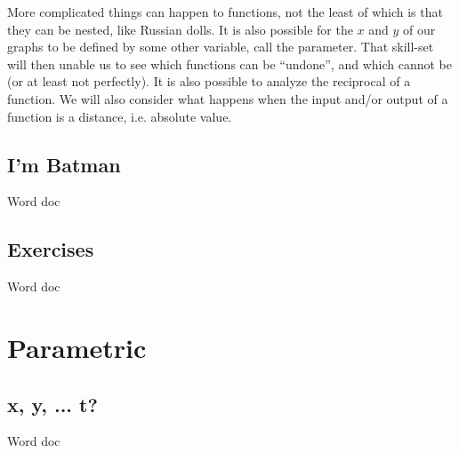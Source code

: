 

More complicated things can happen to functions, not the least of which is that they can be nested, 
like Russian dolls.  It is also possible for the $x$ and $y$ of our graphs to be defined by some
other variable, call the parameter.  That skill-set will then unable us to see which functions can
be ``undone'', and which cannot be (or at least not perfectly).  It is also possible 
to analyze the reciprocal of a function.   We will also consider what happens when the input and/or
output of a function is a distance, i.e. absolute value.


\newpage
\chapterminitoc

\newpage
{}
\subsection{I'm Batman}
Word doc
\newpage

\newpage
\subsection{Exercises}
Word doc



\newpage
\section{Parametric}
\subsection{x, y, ... t?}
Word doc
\newpage

~\vfill
